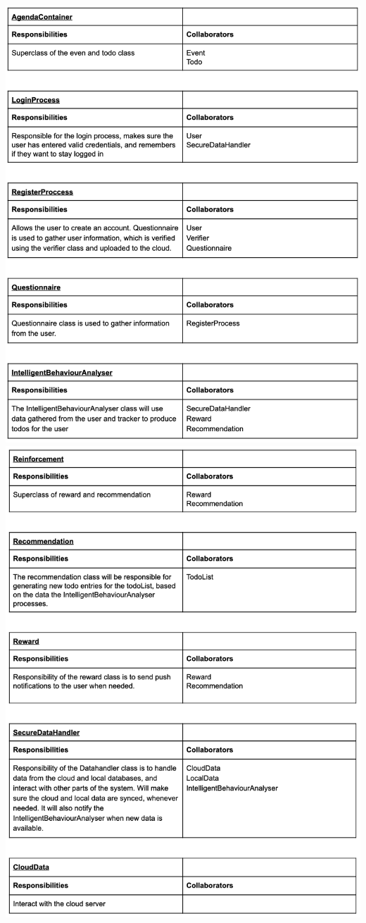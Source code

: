 \documentclass[a4paper,11pt]{article} %
\begin{document}
\begin{center}
  \includegraphics[width=\textwidth]{img/noun-verb/rda-table2.png}
  \includegraphics[width=\textwidth]{img/noun-verb/rda-table3.png}

\end{center}
\end{document}
